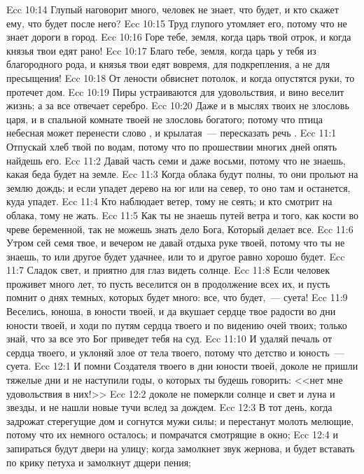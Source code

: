 \vs Ecc 10:14 Глупый наговорит много,  человек не знает, что будет, и кто скажет ему, что будет после него?
\vs Ecc 10:15 Труд глупого утомляет его, потому что не знает  дороги в город.
\vs Ecc 10:16 Горе тебе, земля, когда царь твой отрок, и когда князья твои едят рано!
\vs Ecc 10:17 Благо тебе, земля, когда царь у тебя из благородного рода, и князья твои едят вовремя, для подкрепления, а не для пресыщения!
\vs Ecc 10:18 От лености обвиснет потолок, и когда опустятся руки, то протечет дом.
\vs Ecc 10:19 Пиры устраиваются для удовольствия, и вино веселит жизнь; а за все отвечает серебро.
\vs Ecc 10:20 Даже и в мыслях твоих не злословь царя, и в спальной комнате твоей не злословь богатого; потому что птица небесная может перенести слово , и крылатая~--- пересказать речь .
\vs Ecc 11:1 Отпускай хлеб твой по водам, потому что по прошествии многих дней опять найдешь его.
\vs Ecc 11:2 Давай часть семи и даже восьми, потому что не знаешь, какая беда будет на земле.
\vs Ecc 11:3 Когда облака будут полны, то они прольют на землю дождь; и если упадет дерево на юг или на север, то оно там и останется, куда упадет.
\vs Ecc 11:4 Кто наблюдает ветер, тому не сеять; и кто смотрит на облака, тому не жать.
\vs Ecc 11:5 Как ты не знаешь путей ветра и того, как  кости во чреве беременной, так не можешь знать дело Бога, Который делает все.
\vs Ecc 11:6 Утром сей семя твое, и вечером не давай отдыха руке твоей, потому что ты не знаешь, то или другое будет удачнее, или то и другое равно хорошо будет.
\vs Ecc 11:7 Сладок свет, и приятно для глаз видеть солнце.
\vs Ecc 11:8 Если человек проживет  много лет, то пусть веселится он в продолжение всех их, и пусть помнит о днях темных, которых будет много: все, что будет,~--- суета!
\vs Ecc 11:9 Веселись, юноша, в юности твоей, и да вкушает сердце твое радости во дни юности твоей, и ходи по путям сердца твоего и по видению очей твоих; только знай, что за все это Бог приведет тебя на суд.
\vs Ecc 11:10 И удаляй печаль от сердца твоего, и уклоняй злое от тела твоего, потому что детство и юность~--- суета.
\vs Ecc 12:1 И помни Создателя твоего в дни юности твоей, доколе не пришли тяжелые дни и не наступили годы, о которых ты будешь говорить: <<нет мне удовольствия в них!>>
\vs Ecc 12:2 доколе не померкли солнце и свет и луна и звезды, и не нашли новые тучи вслед за дождем.
\vs Ecc 12:3 В тот день, когда задрожат стерегущие дом и согнутся мужи силы; и перестанут молоть мелющие, потому что их немного осталось; и помрачатся смотрящие в окно;
\vs Ecc 12:4 и запираться будут двери на улицу; когда замолкнет звук жернова, и будет вставать  по крику петуха и замолкнут дщери пения;

